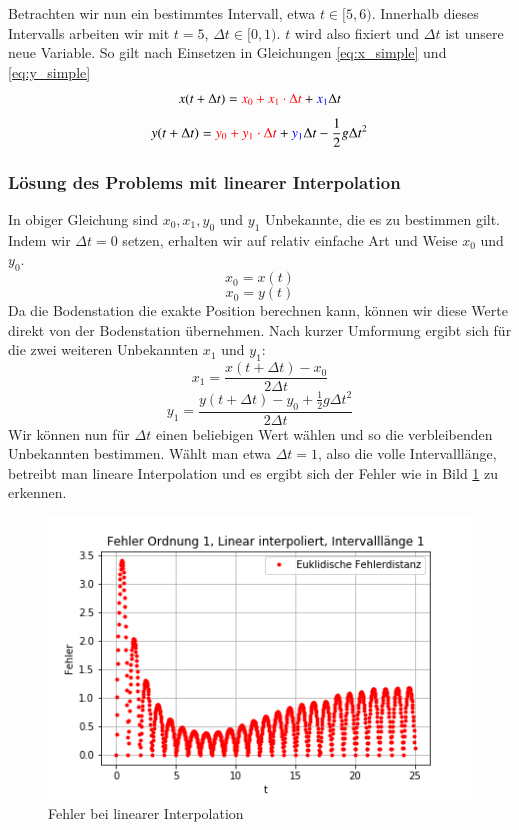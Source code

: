 Betrachten wir nun ein bestimmtes Intervall, etwa $t \in [5,6)$. Innerhalb dieses Intervalls arbeiten wir mit $t=5$, $\Delta t \in [0,1)$. 
$t$ wird also fixiert und $\Delta t$ ist unsere neue Variable. 
So gilt nach Einsetzen in Gleichungen \ref{eq:x_simple} und \ref{eq:y_simple} 
\begin{equation}\label{eq:x_ordnung1}
    x(t+ \Delta t) = \textcolor{red}{x_0 +   x_1  \cdot \Delta t} + \textcolor{blue}{x_1} \Delta t
\end{equation}
\begin{equation}\label{eq:y_ordnung1}
    y(t+ \Delta t) = \textcolor{red}{y_0 +   y_1  \cdot \Delta t} + \textcolor{blue}{y_1} \Delta t - \frac{1}{2}g \Delta t^2
\end{equation}

\subsubsection{Lösung des Problems mit linearer Interpolation}
In obiger Gleichung sind $x_0, x_1, y_0$ und $y_1$ Unbekannte, die es zu bestimmen gilt. 
Indem wir $\Delta t = 0$ setzen, erhalten wir auf relativ einfache Art und Weise $x_0$ und $y_0$.
\[
x_0 = x(t)
\]
\[
x_0 = y(t)
\]
Da die Bodenstation die exakte Position berechnen kann, können wir diese Werte direkt von der Bodenstation übernehmen. 
Nach kurzer Umformung ergibt sich für die zwei weiteren Unbekannten $x_1$ und $y_1$:
\[
x_1 = \frac{x(t + \Delta t) - x_0}{2 \Delta t}
\]
\[
y_1 = \frac{y(t + \Delta t) - y_0 + \frac{1}{2}g \Delta t ^2}{2 \Delta t}
\]
Wir können nun für $\Delta t$ einen beliebigen Wert wählen und so die verbleibenden Unbekannten bestimmen. 
Wählt man etwa $\Delta t = 1$, also die volle Intervalllänge, betreibt man lineare Interpolation und es ergibt sich der Fehler wie in Bild \ref{errorOrdnung1Linear} zu erkennen.

\begin{figure}
    \centering
    \includegraphics[scale = 0.7]{papers/perturbation/bilder/linear_error.png}
    \caption{Fehler bei linearer Interpolation}
	\label{errorOrdnung1Linear}
\end{figure}


